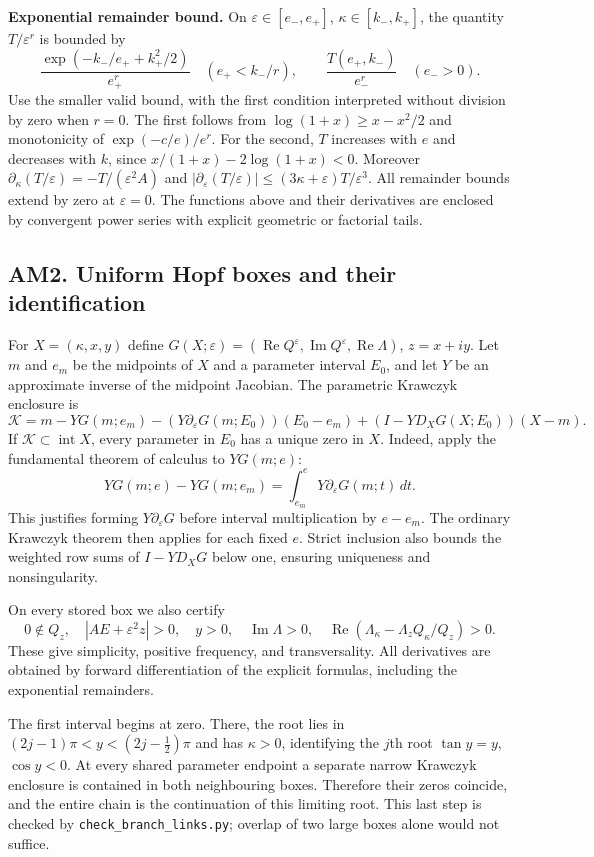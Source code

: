 \textbf{Exponential remainder bound.}
On $\varepsilon\in[e_-,e_+]$, $\kappa\in[k_-,k_+]$, the quantity $T/\varepsilon^r$
is bounded by
\[
 \frac{\exp(-k_-/e_++k_+^2/2)}{e_+^r}\quad(e_+<k_-/r),
 \qquad \frac{T(e_+,k_-)}{e_-^r}\quad(e_->0).
\]
Use the smaller valid bound, with the first condition interpreted without division by zero
when $r=0$. The first follows from $\log(1+x)\ge x-x^2/2$ and monotonicity of
$\exp(-c/e)/e^r$. For the second, $T$ increases with $e$ and decreases with $k$, since
$x/(1+x)-2\log(1+x)<0$. Moreover
$\partial_\kappa(T/\varepsilon)=-T/(\varepsilon^2A)$ and
$|\partial_\varepsilon(T/\varepsilon)|\le(3\kappa+\varepsilon)T/\varepsilon^3$.
All remainder bounds extend by zero at $\varepsilon=0$. The functions above and their derivatives
are enclosed by convergent power series with explicit geometric or factorial tails.

\subsection{AM2. Uniform Hopf boxes and their identification}
For $X=(\kappa,x,y)$ define
$G(X;\varepsilon)=(\operatorname{Re}Q^\varepsilon,\operatorname{Im}Q^\varepsilon,
\operatorname{Re}\Lambda)$, $z=x+iy$. Let $m$ and $e_m$ be the midpoints of $X$ and a
parameter interval $E_0$, and let $Y$ be an approximate inverse of the midpoint Jacobian.
The parametric Krawczyk enclosure is
\[
 \mathcal K=m-YG(m;e_m)-(Y\partial_\varepsilon G(m;E_0))(E_0-e_m)
                   +(I-YD_XG(X;E_0))(X-m).
\]
If $\mathcal K\subset\operatorname{int}X$, every parameter in $E_0$ has a unique zero in $X$.
Indeed, apply the fundamental theorem of calculus to $YG(m;e)$:
\[
 YG(m;e)-YG(m;e_m)=\int_{e_m}^{e}Y\partial_\varepsilon G(m;t)\,dt.
\]
This justifies forming $Y\partial_\varepsilon G$ before interval multiplication by $e-e_m$.
The ordinary Krawczyk theorem then applies for each fixed $e$. Strict inclusion also bounds
the weighted row sums of $I-YD_XG$ below one, ensuring uniqueness and nonsingularity.

On every stored box we also certify
\[
 0\notin Q_z,\quad |AE+\varepsilon^2z|>0,\quad y>0,\quad
 \operatorname{Im}\Lambda>0,\quad
 \operatorname{Re}(\Lambda_\kappa-\Lambda_zQ_\kappa/Q_z)>0.
\]
These give simplicity, positive frequency, and transversality. All derivatives are obtained by
forward differentiation of the explicit formulas, including the exponential remainders.

The first interval begins at zero. There, the root lies in
$(2j-1)\pi<y<(2j-\tfrac12)\pi$ and has $\kappa>0$, identifying the $j$th root
$\tan y=y$, $\cos y<0$. At every shared parameter endpoint a separate narrow Krawczyk
enclosure is contained in both neighbouring boxes. Therefore their zeros coincide, and
the entire chain is the continuation of this limiting root. This last step is checked by
\texttt{check\_branch\_links.py}; overlap of two large boxes alone would not suffice.

